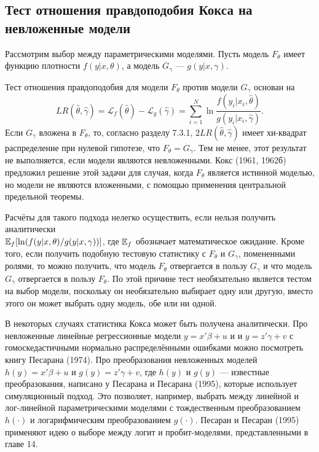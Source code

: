 \subsection{Тест отношения правдоподобия Кокса на невложенные модели}

Рассмотрим выбор между параметрическими моделями. Пусть модель $F_{\theta}$ имеет функцию плотности $f(y|x, \theta)$, а модель $G_{\gamma}$ --- $g(y|x, \gamma)$.

Тест отношения правдоподобия для модели $F_{\theta}$ против модели $G_{\gamma}$ основан на
\begin{equation}
LR(\hat{\theta}, \hat{\gamma}) = \mathcal{L}_f(\hat{\theta}) - \mathcal{L}_g(\hat{\gamma}) = \sum_{i=1}^N \ln  \frac{f(y_i|x_i, \hat{\theta})}{g(y_i|x_i, \hat{\gamma})}.
\end{equation}
Если $G_{\gamma}$ вложена в $F_{\theta}$, то, согласно разделу 7.3.1,  $2LR(\hat{\theta}, \hat{\gamma})$ имеет хи-квадрат распределение при нулевой гипотезе, что $F_{\theta} = G_{\gamma}$. Тем не менее, этот результат не выполняется, если модели являются невложенными. Кокс (1961, 1962б) предложил решение этой задачи для случая, когда $F_{\theta}$ является истинной моделью, но модели не являются вложенными, с помощью применения центральной предельной теоремы.

Расчёты для такого подхода нелегко осуществить, если нельзя получить аналитически \\ $\mathbb{E}_f[\ln (f(y|x, \theta)/g(y|x, \gamma))]$, где $\mathbb{E}_f$ обозначает математическое ожидание. Кроме того, если получить подобную тестовую статистику с $F_{\theta}$ и  $G_{\gamma}$, помененными ролями, то можно получить, что модель $F_{\theta}$ отвергается в пользу $G_{\gamma}$ и что модель $G_{\gamma}$ отвергается в пользу $F_{\theta}$. По этой причине тест необязательно является тестом на выбор модели, поскольку он необязательно выбирает одну или другую, вместо этого он может выбрать одну модель, обе или ни одной.

В некоторых случаях статистика Кокса может быть получена аналитически. Про невложенные линейные регрессионные модели $y = x'\beta + u$ и и $y = z'\gamma + v$ с гомоскедастичными нормально распределёнными ошибками можно посмотреть книгу Песарана (1974). Про преобразования невложенных моделей $h(y) = x'\beta + u$ и $g(y) = z'\gamma + v$, где $h(y)$ и $g(y)$ --- известные преобразования, написано у Песарана и Песарана (1995), которые использует симуляционный подход. Это позволяет, например, выбрать между линейной и лог-линейной параметрическими моделями с тождественным преобразованием $h(\cdot)$  и логарифмическим преобразованием $g(\cdot)$. Песаран и Песаран (1995) применяют идею о выборе между логит и пробит-моделями, представленными в главе 14.


